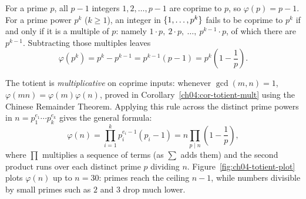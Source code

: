 For a prime $p$, all $p - 1$ integers $1, 2, \dots, p-1$ are coprime to $p$, so
$\varphi(p) = p - 1$. For a prime power $p^k$ ($k \ge 1$), an integer in $\{1, \dots, p^k\}$ fails
to be coprime to $p^k$ if and only if it is a multiple of $p$: namely
$1\cdot p,\ 2\cdot p,\ \dots,\ p^{k-1}\cdot p$, of which there are $p^{k-1}$. Subtracting those
multiples leaves
\[
  \varphi(p^k) = p^k - p^{k-1} = p^{k-1}(p - 1) = p^k\left(1 - \frac{1}{p}\right).
\]

The totient is \emph{multiplicative} on coprime inputs: whenever $\gcd(m, n) = 1$,
$\varphi(mn) = \varphi(m)\varphi(n)$, proved in Corollary~\ref{ch04:cor-totient-mult} using the
Chinese Remainder Theorem. Applying this rule across the distinct prime powers in
$n = p_1^{e_1} \cdots p_k^{e_k}$ gives the general formula:
\[
  \varphi(n) = \prod_{i=1}^{k} p_i^{e_i - 1}(p_i - 1)
             = n \prod_{p \mid n}\left(1 - \frac{1}{p}\right),
\]
where $\prod$ multiplies a sequence of terms (as $\sum$ adds them) and the second product runs over
each distinct prime $p$ dividing $n$. Figure~\ref{fig:ch04-totient-plot}
plots $\varphi(n)$ up to $n = 30$: primes reach the ceiling $n - 1$, while numbers divisible by
small primes such as $2$ and $3$ drop much lower.

